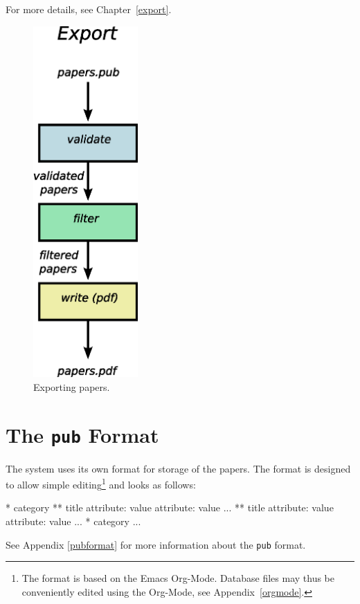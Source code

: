 For more details, see Chapter~\ref{export}.

\begin{figure}[htbp]
  \begin{center}
    \includegraphics[width=4cm]{images/export.eps}
    \caption{Exporting papers.}
    \label{fig:export}
  \end{center}
\end{figure}

\section{The \texttt{pub} Format}

The system uses its own format for storage of the papers. The format
is designed to allow simple editing\footnote{The format is based on
the Emacs Org-Mode. Database files may thus be conveniently edited
using the Org-Mode, see Appendix~\ref{orgmode}.}  and looks as
follows:

\begin{code}
* category
** title
   attribute: value
   attribute: value
   ...
** title
   attribute: value
   attribute: value
   ...
* category
   ...
\end{code}

See Appendix \ref{pubformat} for more information about the
\texttt{pub} format.

